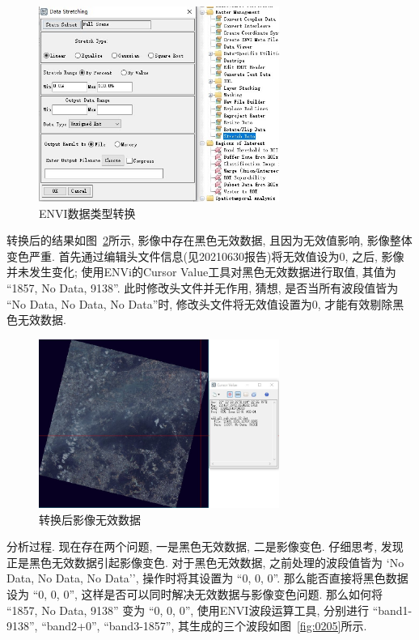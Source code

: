 \begin{figure}[!htbp]
    \centering
    \includegraphics[width=0.7\textwidth]{pic/q0101.jpg}
    \caption{ENVI数据类型转换}
    \label{fig:0203}
\end{figure}

转换后的结果如图~\ref{fig:0204}所示, 影像中存在黑色无效数据, 且因为无效值影响, 影像整体变色严重. 首先通过编辑头文件信息(见20210630报告)将无效值设为0, 之后, 影像并未发生变化; 使用ENVi的Cursor Value工具对黑色无效数据进行取值, 其值为 ``1857, No Data, 9138''. 此时修改头文件并无作用, 猜想, 是否当所有波段值皆为 ``No Data, No Data, No Data''时, 修改头文件将无效值设置为0, 才能有效剔除黑色无效数据. 

\begin{figure}[!htbp]
    \centering
    \includegraphics[width=0.7\textwidth]{pic/q0102.jpg}
    \caption{转换后影像无效数据}
    \label{fig:0204}
\end{figure}

分析过程. 现在存在两个问题, 一是黑色无效数据, 二是影像变色. 仔细思考, 发现正是黑色无效数据引起影像变色. 对于黑色无效数据, 之前处理的波段值皆为 `No Data, No Data, No Data'', 操作时将其设置为 ``0, 0, 0''. 那么能否直接将黑色数据设为 ``0, 0, 0'', 这样是否可以同时解决无效数据与影像变色问题. 那么如何将 ``1857, No Data, 9138'' 变为 ``0, 0, 0'', 使用ENVI波段运算工具, 分别进行 ``band1-9138'', ``band2+0'', ``band3-1857'', 其生成的三个波段如图~\ref{fig:0205}所示.


